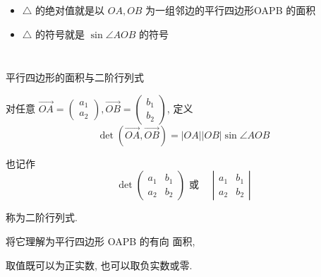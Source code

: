 \documentclass[10pt,punct]{ctexbeamer}
\begin{document}
\begin{frame}
\begin{columns}[c]
        \pause
        \begin{itemize}
            \item  $\triangle$ 的\alert{绝对值}就是以 $O A, O B$ 为一组邻边的平行四边形OAPB 的面积
            \item   $\triangle$ 的\alert{符号}就是 $\sin \angle A O B$ 的符号
        \end{itemize}


    \end{columns}



\end{frame}

\begin{frame}{平行四边形的面积与二阶行列式}


    对任意 $\overrightarrow{O A}=\left(\begin{array}{l}a_1 \\ a_2\end{array}\right), \overrightarrow{O B}=\left(\begin{array}{l}b_1 \\ b_2\end{array}\right)$, 定义 $$\operatorname{det}(\overrightarrow{O A}, \overrightarrow{O B})=|O A||O B| \sin \angle A O B$$

    也记作
    $$\operatorname{det}\left(\begin{array}{ll}a_1 & b_1 \\ a_2 & b_2\end{array}\right) \mbox{ 或  } \quad \left|\begin{array}{ll}a_1 & b_1 \\ a_2 & b_2\end{array}\right|$$


    称为\alert{二阶行列式}.

    将它理解为平行四边形 OAPB 的\alert{有向 面积},

    取值既可以为正实数, 也可以取负实数或零.
\end{frame}
\end{document}
